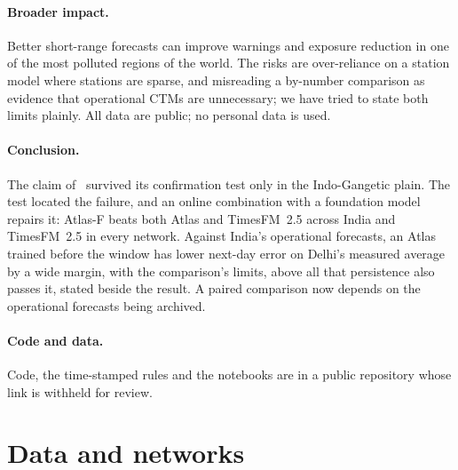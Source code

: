 \documentclass{article}
\newif\ifpreprint
\begin{document}
\paragraph{Broader impact.} Better short-range forecasts can improve warnings and exposure reduction in one of the most
polluted regions of the world. The risks are over-reliance on a station model where stations are sparse, and
misreading a by-number comparison as evidence that operational CTMs are unnecessary; we have tried to state both limits
plainly. All data are public; no personal data is used.

\paragraph{Conclusion.} The claim of~\citet{atlas1} survived its confirmation test only in the Indo-Gangetic plain. The test
located the failure, and an online combination with a foundation model repairs it: Atlas-F beats both Atlas and
TimesFM~2.5 across India and TimesFM~2.5 in every network. Against India's operational forecasts, an Atlas trained before
the window has lower next-day error on Delhi's measured average by a wide margin, with the comparison's limits, above all
that persistence also passes it, stated beside the result. A paired comparison now depends on the operational forecasts
being archived.

\ifpreprint
\paragraph{Code and data.} Code, every rule and prediction in the order written, and the notebooks that produced every
number: \url{https://github.com/paradoxailab/paradox-world-model} (branch \texttt{atlas-v0.1}). No data, weights or
keys are stored in it; all data are public.
\else
\paragraph{Code and data.} Code, the time-stamped rules and the notebooks are in a public repository whose link is
withheld for review.
\fi




\appendix
\section{Data and networks}
\label{app:data}
\end{document}
